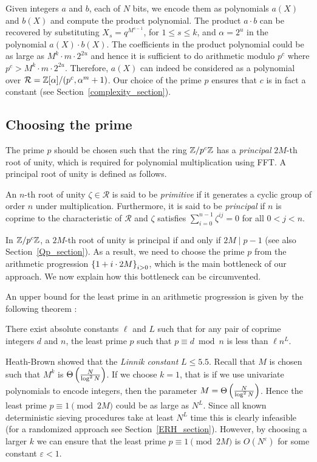 \documentclass[11pt]{article}
\renewcommand{\R}{\mathcal{R}} %
\begin{document}
Given integers $a$ and $b$, each of $N$ bits, we encode them as
polynomials $a(X)$ and $b(X)$ and compute the product polynomial. The
product $a\cdot b$ can be recovered by substituting $X_s =
q^{M^{s-1}}$, for $1\leq s\leq k$, and $\alpha = 2^u$ in the
polynomial $a(X)\cdot b(X)$.  The coefficients in the product
polynomial could be as large as $M^k\cdot m\cdot 2^{2u}$ and hence it
is sufficient to do arithmetic modulo $p^c$ where $p^c > M^k\cdot
m\cdot 2^{2u}$. Therefore, $a(X)$ can indeed be considered as a
polynomial over $\R = \Z[\alpha]/(p^c, \alpha^m + 1)$. Our choice of
the prime $p$ ensures that $c$ is in fact a constant (see
Section~\ref{complexity_section}).

\subsection{Choosing the prime}\label{prime_section}

The prime $p$ should be chosen such that the ring $\mathbb{Z}/p^c\mathbb{Z}$ has a
\emph{principal} $2M$-th root of unity, which is required for
polynomial multiplication using FFT. A principal root of unity is
defined as follows.

\begin{definition}\label{def-principal-root}
An $n$-th root of unity $\zeta\in \R$ is said to be \emph{primitive}
if it generates a cyclic group of order $n$ under
multiplication. Furthermore, it is said to be \emph{principal} if $n$
is coprime to the characteristic of $\R$ and $\zeta$ satisfies
$\sum_{i=0}^{n-1}\zeta^{ij}=0$ for all $0< j < n$.
\end{definition}
\noindent
In $\mathbb{Z}/p^c\mathbb{Z}$, a $2M$-th root of unity is principal if and only if
$2M\mid p-1$ (see also Section~\ref{Qp_section}). As a result, we need
to choose the prime $p$ {}from the arithmetic progression $\left\{1 +
i\cdot 2M\right\}_{i> 0}$, which is the main bottleneck of our approach.  We
now explain how this bottleneck can be circumvented.


An upper bound for the least prime in an arithmetic progression is
given by the following theorem \cite{Linnik}:

\begin{theorem}[Linnik]\label{linnik_theorem}
There exist absolute constants $\ell$ and $L$ such that for any pair
of coprime integers $d$ and $n$, the least prime $p$ such that
$p\equiv d\bmod{n}$ is less than $\ell n^L$.
\end{theorem}

Heath-Brown\cite{Brown} showed that the \emph{Linnik constant} $L\leq
5.5$. Recall that $M$ is chosen such that $M^k$ is
$\Theta\left(\frac{N}{\log^2N}\right)$. If we choose $k=1$, that is if we
use univariate polynomials to encode integers, then the parameter $M =
\Theta\left(\frac{N}{\log^2N}\right)$. Hence the least prime $p\equiv
1\pmod{2M}$ could be as large as $N^L$. Since all known deterministic
sieving procedures take at least $N^L$ time this is clearly infeasible
(for a randomized approach see Section~\ref{ERH_section}). However, by
choosing a larger $k$ we can ensure that the least prime $p\equiv
1\pmod{2M}$ is $O(N^\varepsilon)$ for some constant $\varepsilon < 1$.
\end{document}
